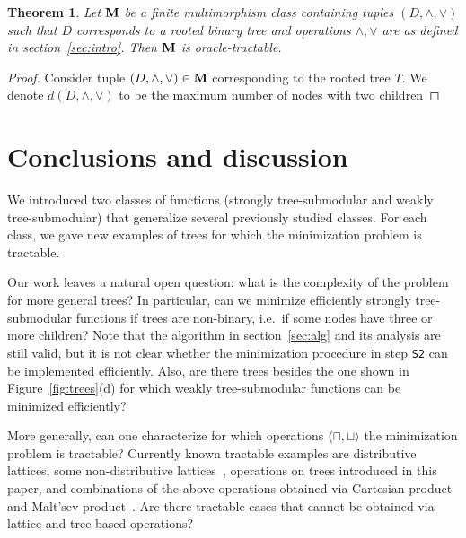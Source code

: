 \documentclass[11pt,onecolumn]{article}
\newtheorem{theorem}{Theorem}
\begin{document}
{\begin{theorem}
Let ${\bf M}$ be a finite multimorphism class containing tuples $(D,\wedge,\vee)$ such
that $D$ corresponds to a rooted binary tree and operations $\wedge,\vee$ are as defined in section~\ref{sec:intro}.
Then ${\bf M}$ is oracle-tractable.
\end{theorem}
\begin{proof}
Consider tuple $(D,\wedge,\vee)\in {\bf M}$ corresponding to the rooted tree $T$.
We denote $d(D,\wedge,\vee)$ to be the maximum number of nodes with two children
\end{proof}
}

\section{Conclusions and discussion}
We introduced two classes of functions (strongly tree-submodular and weakly tree-submodular)
that generalize several previously studied classes. For each class, we gave new examples of trees
for which the minimization problem is tractable.

Our work leaves a natural open question: what is the complexity of the problem for more general trees?
In particular, can we minimize efficiently strongly tree-submodular functions if trees are non-binary,
i.e.\ if some nodes have three or more children? Note that the algorithm in section~\ref{sec:alg}
and its analysis are still valid, but it is not clear whether the minimization procedure in step {\tt S2}
can be implemented efficiently. Also, are there trees besides the one shown in Figure~\ref{fig:trees}(d)
for which weakly tree-submodular functions can be minimized efficiently?

More generally, can one characterize for which operations $\langle\sqcap,\sqcup\rangle$ the minimization problem
is tractable? Currently known tractable examples are distributive lattices, some non-distributive lattices~\cite{KrokhinLarose:08,Kuivinen:TR},
operations on trees introduced in this paper, and combinations of the above operations obtained via Cartesian product and Malt'sev product~\cite{KrokhinLarose:08}.
Are there tractable cases that cannot be obtained via lattice and tree-based operations?
\end{document}
